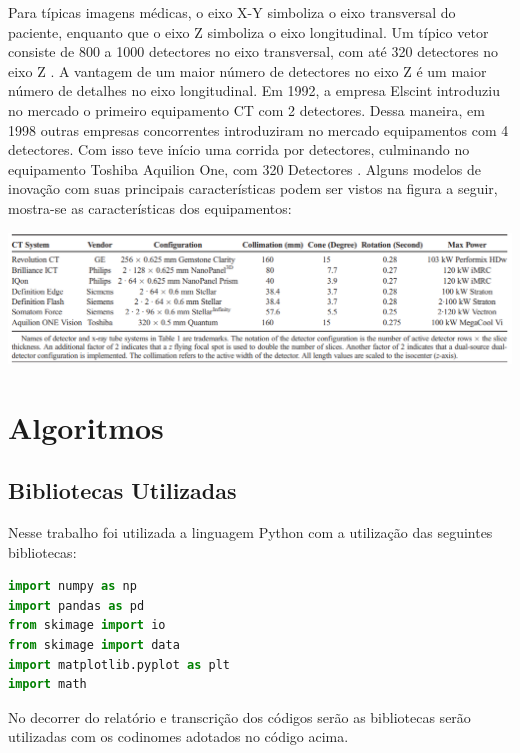\documentclass[a4paper, 12pt]{article}
\begin{document}
Para típicas imagens médicas, o eixo X-Y simboliza o eixo transversal do paciente, enquanto que o eixo Z simboliza o eixo longitudinal. Um típico vetor consiste de 800 a 1000 detectores no eixo transversal, com até 320 detectores no eixo Z \citep{lell2015evolution}. A vantagem de um maior número de detectores no eixo Z é um maior número de detalhes no eixo longitudinal. Em 1992, a empresa Elscint introduziu no mercado o primeiro equipamento CT com 2 detectores. Dessa maneira, em 1998 outras empresas concorrentes introduziram no mercado equipamentos com 4 detectores. Com isso teve início uma corrida por detectores, culminando no equipamento Toshiba Aquilion One, com 320 Detectores \citep{lell2015evolution}. Alguns modelos de inovação com suas principais características podem ser vistos na figura a seguir, mostra-se as características dos equipamentos:
\begin{center}
    \includegraphics[width=16cm]{modelos ct.png}
\end{center}
        
\section{Algoritmos}

\subsection {Bibliotecas Utilizadas}

Nesse trabalho foi utilizada a linguagem Python com a utilização das seguintes bibliotecas:

\begin{lstlisting}[language=Python, caption=Import de bibliotecas, label=listing_bibliotecas] 
import numpy as np
import pandas as pd
from skimage import io
from skimage import data
import matplotlib.pyplot as plt
import math
\end{lstlisting}

No decorrer do relatório e transcrição dos códigos serão as bibliotecas serão utilizadas com os codinomes adotados no código acima.
\end{document}

